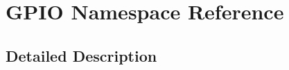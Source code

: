 \hypertarget{namespace_g_p_i_o}{}\section{G\+P\+IO Namespace Reference}
\label{namespace_g_p_i_o}


\subsection{Detailed Description}
